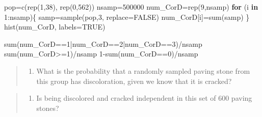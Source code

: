\documentclass[
]{article}
\newenvironment{Shaded}{\begin{snugshade}}{\end{snugshade}}
\newcommand{\AttributeTok}[1]{\textcolor[rgb]{0.77,0.63,0.00}{#1}}
\newcommand{\ConstantTok}[1]{\textcolor[rgb]{0.00,0.00,0.00}{#1}}
\newcommand{\ControlFlowTok}[1]{\textcolor[rgb]{0.13,0.29,0.53}{\textbf{#1}}}
\newcommand{\DecValTok}[1]{\textcolor[rgb]{0.00,0.00,0.81}{#1}}
\newcommand{\FunctionTok}[1]{\textcolor[rgb]{0.00,0.00,0.00}{#1}}
\newcommand{\NormalTok}[1]{#1}
\newcommand{\OtherTok}[1]{\textcolor[rgb]{0.56,0.35,0.01}{#1}}
\newcommand{\SpecialCharTok}[1]{\textcolor[rgb]{0.00,0.00,0.00}{#1}}
\providecommand{\tightlist}{%
  \setlength{\itemsep}{0pt}\setlength{\parskip}{0pt}}
\begin{document}
\begin{Shaded}
\begin{Highlighting}[]
\NormalTok{pop}\OtherTok{=}\FunctionTok{c}\NormalTok{(}\FunctionTok{rep}\NormalTok{(}\DecValTok{1}\NormalTok{,}\DecValTok{38}\NormalTok{), }\FunctionTok{rep}\NormalTok{(}\DecValTok{0}\NormalTok{,}\DecValTok{562}\NormalTok{))}
\NormalTok{nsamp}\OtherTok{=}\DecValTok{500000}
\NormalTok{num\_CorD}\OtherTok{=}\FunctionTok{rep}\NormalTok{(}\DecValTok{9}\NormalTok{,nsamp)}
\ControlFlowTok{for}\NormalTok{ (i }\ControlFlowTok{in} \DecValTok{1}\SpecialCharTok{:}\NormalTok{nsamp)\{}
\NormalTok{  samp}\OtherTok{=}\FunctionTok{sample}\NormalTok{(pop,}\DecValTok{3}\NormalTok{, }\AttributeTok{replace=}\ConstantTok{FALSE}\NormalTok{)}
\NormalTok{  num\_CorD[i]}\OtherTok{=}\FunctionTok{sum}\NormalTok{(samp)}
\NormalTok{\}}
\FunctionTok{hist}\NormalTok{(num\_CorD, }\AttributeTok{labels=}\ConstantTok{TRUE}\NormalTok{)}

\FunctionTok{sum}\NormalTok{(num\_CorD}\SpecialCharTok{==}\DecValTok{1}\SpecialCharTok{|}\NormalTok{num\_CorD}\SpecialCharTok{==}\DecValTok{2}\SpecialCharTok{|}\NormalTok{num\_CorD}\SpecialCharTok{==}\DecValTok{3}\NormalTok{)}\SpecialCharTok{/}\NormalTok{nsamp}
\FunctionTok{sum}\NormalTok{(num\_CorD}\SpecialCharTok{\textgreater{}=}\DecValTok{1}\NormalTok{)}\SpecialCharTok{/}\NormalTok{nsamp}
\DecValTok{1}\SpecialCharTok{{-}}\FunctionTok{sum}\NormalTok{(num\_CorD}\SpecialCharTok{==}\DecValTok{0}\NormalTok{)}\SpecialCharTok{/}\NormalTok{nsamp}
\end{Highlighting}
\end{Shaded}

\vspace{.5cm}

\begin{quote}
\begin{enumerate}
\def\labelenumi{\alph{enumi}.}
\setcounter{enumi}{4}
\tightlist
\item
  What is the probability that a randomly sampled paving stone from this
  group has discoloration, given we know that it is cracked?
\end{enumerate}
\end{quote}

\vspace{.5cm}

\begin{quote}
\begin{enumerate}
\def\labelenumi{\alph{enumi}.}
\setcounter{enumi}{5}
\tightlist
\item
  Is being discolored and cracked independent in this set of 600 paving
  stones?
\end{enumerate}
\end{quote}
\end{document}
